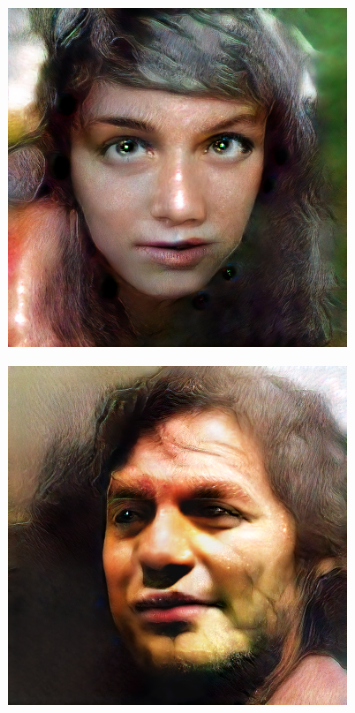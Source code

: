 \documentclass{Bredelebeamer}
\begin{document}
\begin{frame}
\begin{figure}[h!]
	\centering
	\includegraphics[width=0.8\textwidth]{4k_woman.jpg}
\end{figure}
\end{frame}

\begin{frame}
\begin{figure}[h!]
	\centering
	\includegraphics[width=0.8\textwidth]{4k_man.jpg}
\end{figure}
\end{frame}
\end{document}
